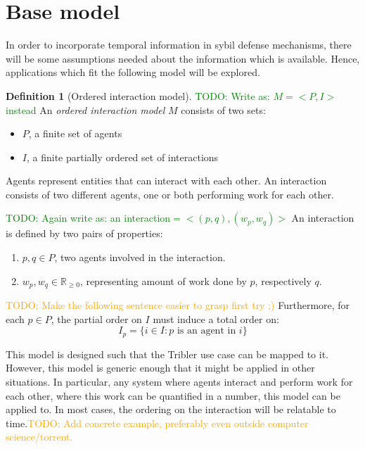 \documentclass[a4paper,11pt]{book}
\newcommand{\bb}{\mathbb}
\newcommand\nicetohave[1]{\textcolor{orange}{TODO: #1}}
\newcommand\suggestion[1]{\textcolor{green}{TODO: #1}}
\theoremstyle{definition}
\newtheorem{definition}{Definition}
\begin{document}
\section{Base model}

In order to incorporate temporal information in sybil defense mechanisms,
there will be some assumptions needed about the information which is available.
Hence, applications which fit the following model will be explored.

\begin{definition}[Ordered interaction model]
		\suggestion{Write as: $M=<P,I>$ instead}
    An \emph{ordered interaction model} $M$ consists of two sets:  
    
    \begin{itemize}
        \item $P$, a finite set of agents
        \item $I$, a finite partially ordered set of interactions
    \end{itemize}

    Agents represent entities that can interact with each other.
    An interaction consists of two different agents, one or both performing
    work for each other. 
    
		\suggestion{Again write as: an interaction$=<(p,q),(w_p,w_q)>$}
    An interaction is defined by two pairs of properties:
    \begin{enumerate}
        \item $p, q \in P$, two agents involved in the interaction.
        \item $w_p, w_q \in \bb{R}_{\geq0}$, representing amount of work done by $p$, respectively $q$.
    \end{enumerate}

		\nicetohave{Make the following sentence easier to grasp first try ;)}
    Furthermore, for each $p \in P$, the partial order on $I$ must induce a total order on:
    \begin{equation*}
        I_p = \{i \in I : p \mbox{ is an agent in } i\}
    \end{equation*}
\end{definition}

This model is designed such that the Tribler use case can be mapped to it. However, this model is
generic enough that it might be applied in other situations. In particular, any system where
agents interact and perform work for each other, where this work can be quantified in a number,
this model can be applied to. In most cases, the ordering on the interaction will be relatable
to time.\nicetohave{Add concrete example, preferably even outside computer science/torrent.}
\end{document}
